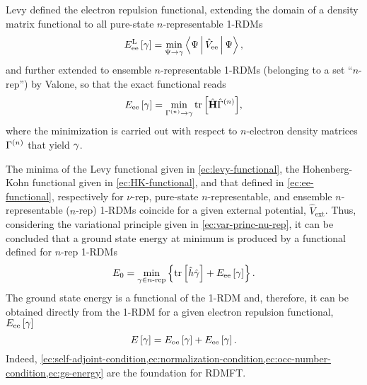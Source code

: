 Levy defined the electron repulsion functional, extending the domain of a density matrix 
functional to all pure-state $n$-representable 1-RDMs
\begin{equation} \label{ec:levy-functional}
    \func{E_{\text{ee}}^{\text{L}}}{\fordm} = 
    \min_{\Psi \to \fordm} \Braket{\Psi | \hat{V}_{\text{ee}} | \Psi}
    ,
\end{equation}
and further extended to ensemble $n$-representable 1-RDMs (belonging to a set
``$n$-rep'') by Valone, so that the
exact functional reads 
\begin{equation} \label{ec:ee-functional}
    \func{E_{\text{ee}}}{\fordm} =
    \min_{\sordm^{\left( n \right)}\to \fordm} \mytrace{\hat{ \mat{H}} \hat{\sordm}^{\left( n \right)}}
    ,
\end{equation}
where the minimization is carried out with respect to $n$-electron density
matrices $\Gamma^{\left( n \right)}$ that yield $\gamma$.

The minima of the Levy functional given in \cref{ec:levy-functional}, the 
Hohenberg-Kohn functional given in \cref{ec:HK-functional}, and that defined in
\cref{ec:ee-functional}, respectively for $\nu$-rep, pure-state $n$-representable,
and ensemble $n$-representable ($n$-rep) 1-RDMs coincide
for a given external potential, $\hat{V}_{\text{ext}}$.
Thus, considering the variational principle given in \cref{ec:var-princ-nu-rep}, 
it can be concluded that a ground state energy at minimum is produced by a 
functional defined for $n$-rep 1-RDMs
\begin{equation} \label{ec:gs-energy}
    E_0 = \min_{\fordm \in \text{$n$-rep}}
    \left\{ \mytrace{\hat{h} \hat{\fordm}} + \func{E_{\text{ee}}}{\fordm} \right\}
    .
\end{equation}
The ground state energy is a functional of the 1-RDM and, therefore, it can be
obtained directly from the 1-RDM for a given electron repulsion functional,
$E_{\text{ee}}\left[ \gamma \right]$
\begin{equation}
    E \left[ \gamma \right] = 
    E_{\text{oe}} \left[ \gamma \right] +
    E_{\text{ee}} \left[ \gamma \right]
    .
\end{equation}
Indeed, \cref{ec:self-adjoint-condition,ec:normalization-condition,ec:occ-number-condition,ec:gs-energy}
are the foundation for RDMFT.

